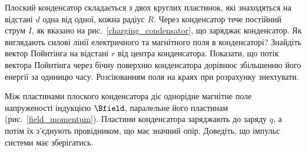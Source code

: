 \begin{problem}\label{prb:charging_condensator}
Плоский конденсатор складається з двох круглих пластинок, які знаходяться на відстані $d$  одна від одної, кожна  радіус $R$. Через конденсатор тече постійний струм $I$, як вказано на рис.~\ref{charging_condensator}, що заряджає конденсатор. Як виглядають силові лінії електричного та магнітного поля в конденсаторі? Знайдіть вектор Пойнтінга на відстані $r$ від центра конденсатора. Показати, що потік вектора Пойнтінга через бічну поверхню конденсатора дорівнює збільшенню його енергії за одиницю часу. Розсіюванням поля на краях при розрахунку знехтувати.
\end{problem}

\begin{problem}\label{prb:field_momentum}
    Між пластинами плоского конденсатора діє однорідне магнітне поле напруженості індукцією $\Bfield$, паралельне його пластинам (рис.~\ref{field_momentum}). Пластини конденсатора заряджають до заряду $q$, а потім їх з'єднують провідником, що має значний опір. Доведіть, що імпульс системи має зберігатись.
\end{problem}

